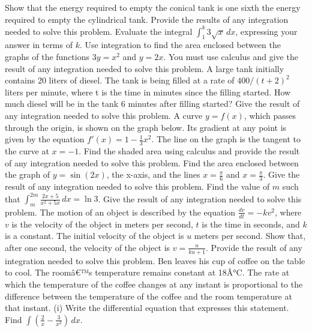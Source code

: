 \documentclass[12pt,addpoints]{exam}
\begin{document}
\begin{questions}
Show that the energy required to empty the conical tank is one sixth the energy required to empty the cylindrical tank. Provide the results of any integration needed to solve this problem.
\fillwithlines{5cm}
\question[5] Evaluate the integral \(\int_{1}^{k} 3\sqrt{x} \, dx\), expressing your answer in terms of \(k\).
\fillwithlines{5cm}
\question[5] Use integration to find the area enclosed between the graphs of the functions \(3y = x^2\) and \(y = 2x\). You must use calculus and give the result of any integration needed to solve this problem.
\fillwithlines{5cm}
\question[5] A large tank initially contains 20 liters of diesel. The tank is being filled at a rate of \(400/(t+2)^2\) liters per minute, where t is the time in minutes since the filling started. How much diesel will be in the tank 6 minutes after filling started? Give the result of any integration needed to solve this problem.
\fillwithlines{5cm}
\question[5] A curve \( y = f(x) \), which passes through the origin, is shown on the graph below. Its gradient at any point is given by the equation \( f'(x) = 1 - \frac{1}{3}x^2 \). The line on the graph is the tangent to the curve at \( x = -1 \). Find the shaded area using calculus and provide the result of any integration needed to solve this problem.
\fillwithlines{5cm}
\question[5] Find the area enclosed between the graph of \( y = \sin(2x) \), the x-axis, and the lines \( x = \frac{\pi}{6} \) and \( x = \frac{\pi}{3} \). Give the result of any integration needed to solve this problem.
\fillwithlines{5cm}
\question[5] Find the value of \( m \) such that \(\int_{m}^{2m} \frac{2x+5}{x^2+5x} \, dx = \ln 3\). Give the result of any integration needed to solve this problem.
\fillwithlines{5cm}
\question[5] The motion of an object is described by the equation \( \frac{dv}{dt} = -kv^2 \), where \( v \) is the velocity of the object in meters per second, \( t \) is the time in seconds, and \( k \) is a constant. The initial velocity of the object is \( u \) meters per second. Show that, after one second, the velocity of the object is \( v = \frac{u}{ku + 1} \). Provide the result of any integration needed to solve this problem.
\fillwithlines{5cm}
\question[5] Ben leaves his cup of coffee on the table to cool. The roomâ€™s temperature remains constant at 18Â°C. The rate at which the temperature of the coffee changes at any instant is proportional to the difference between the temperature of the coffee and the room temperature at that instant. (i) Write the differential equation that expresses this statement.
\fillwithlines{5cm}
\question[5] Find \(\int \left( \frac{2}{x} - \frac{3}{x^2} \right) \, dx\).

\end{questions}
\end{document}
